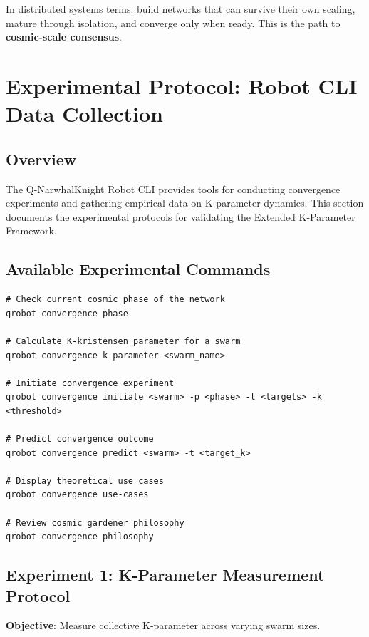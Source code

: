 \documentclass[12pt,a4paper]{article}
\begin{document}
In distributed systems terms: build networks that can survive their own scaling,
mature through isolation, and converge only when ready. This is the path to
\textbf{cosmic-scale consensus}.

\section{Experimental Protocol: Robot CLI Data Collection}

\subsection{Overview}

The Q-NarwhalKnight Robot CLI provides tools for conducting convergence experiments
and gathering empirical data on K-parameter dynamics. This section documents the
experimental protocols for validating the Extended K-Parameter Framework.

\subsection{Available Experimental Commands}

\begin{verbatim}
# Check current cosmic phase of the network
qrobot convergence phase

# Calculate K-kristensen parameter for a swarm
qrobot convergence k-parameter <swarm_name>

# Initiate convergence experiment
qrobot convergence initiate <swarm> -p <phase> -t <targets> -k <threshold>

# Predict convergence outcome
qrobot convergence predict <swarm> -t <target_k>

# Display theoretical use cases
qrobot convergence use-cases

# Review cosmic gardener philosophy
qrobot convergence philosophy
\end{verbatim}

\subsection{Experiment 1: K-Parameter Measurement Protocol}

\textbf{Objective}: Measure collective K-parameter across varying swarm sizes.
\end{document}
